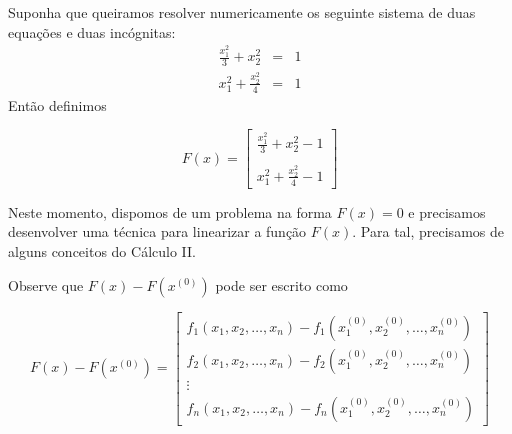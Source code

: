\begin{ex} Suponha que queiramos resolver numericamente os seguinte sistema de duas equações e duas incógnitas:
\begin{eqnarray*}
\frac{x_1^2}{3}+x_2^2&=&1\\
x_1^2+\frac{x_2^2}{4}&=&1
\end{eqnarray*}
Então definimos

$$F(x)=\left[
\begin{array}{c}
\frac{x_1^2}{3}+x_2^2-1\\~\\
x_1^2+\frac{x_2^2}{4}-1
\end{array}
\right]$$
\end{ex}
Neste momento, dispomos de um problema na forma $F(x)=0$ e precisamos desenvolver uma técnica para linearizar a função $F(x)$. Para tal, precisamos de alguns conceitos do Cálculo II.

Observe que $F(x)-F(x^{(0)})$ pode ser escrito como

$$F(x)-F(x^{(0)})=\left[
\begin{array}{c}
f_1(x_1,x_2,\ldots,x_n)-f_1(x_1^{(0)},x_2^{(0)},\ldots,x_n^{(0)})\\
f_2(x_1,x_2,\ldots,x_n)-f_2(x_1^{(0)},x_2^{(0)},\ldots,x_n^{(0)})\\
\vdots\\
f_n(x_1,x_2,\ldots,x_n)-f_n(x_1^{(0)},x_2^{(0)},\ldots,x_n^{(0)})
\end{array}
\right]$$

